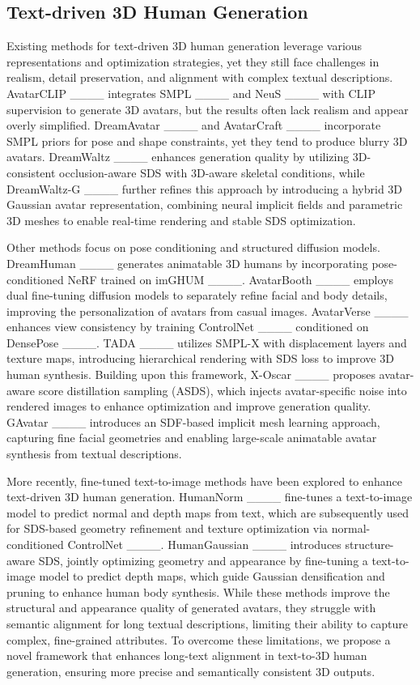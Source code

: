 \subsection{Text-driven 3D Human Generation}\label{2.2}
Existing methods for text-driven 3D human generation leverage various representations and optimization strategies, yet they still face challenges in realism, detail preservation, and alignment with complex textual descriptions. AvatarCLIP ____ integrates SMPL ____ and NeuS ____ with CLIP supervision to generate 3D avatars, but the results often lack realism and appear overly simplified. DreamAvatar ____ and AvatarCraft ____ incorporate SMPL priors for pose and shape constraints, yet they tend to produce blurry 3D avatars. DreamWaltz ____ enhances generation quality by utilizing 3D-consistent occlusion-aware SDS with 3D-aware skeletal conditions, while DreamWaltz-G ____ further refines this approach by introducing a hybrid 3D Gaussian avatar representation, combining neural implicit fields and parametric 3D meshes to enable real-time rendering and stable SDS optimization.

Other methods focus on pose conditioning and structured diffusion models. DreamHuman ____ generates animatable 3D humans by incorporating pose-conditioned NeRF trained on imGHUM ____. AvatarBooth ____ employs dual fine-tuning diffusion models to separately refine facial and body details, improving the personalization of avatars from casual images. AvatarVerse ____ enhances view consistency by training ControlNet ____ conditioned on DensePose ____. TADA ____ utilizes SMPL-X with displacement layers and texture maps, introducing hierarchical rendering with SDS loss to improve 3D human synthesis. Building upon this framework, X-Oscar ____ proposes avatar-aware score distillation sampling (ASDS), which injects avatar-specific noise into rendered images to enhance optimization and improve generation quality. GAvatar ____ introduces an SDF-based implicit mesh learning approach, capturing fine facial geometries and enabling large-scale animatable avatar synthesis from textual descriptions.

More recently, fine-tuned text-to-image methods have been explored to enhance text-driven 3D human generation. HumanNorm ____ fine-tunes a text-to-image model to predict normal and depth maps from text, which are subsequently used for SDS-based geometry refinement and texture optimization via normal-conditioned ControlNet ____. HumanGaussian ____ introduces structure-aware SDS, jointly optimizing geometry and appearance by fine-tuning a text-to-image model to predict depth maps, which guide Gaussian densification and pruning to enhance human body synthesis. While these methods improve the structural and appearance quality of generated avatars, they struggle with semantic alignment for long textual descriptions, limiting their ability to capture complex, fine-grained attributes.
To overcome these limitations, we propose a novel framework that enhances long-text alignment in text-to-3D human generation, ensuring more precise and semantically consistent 3D outputs.

